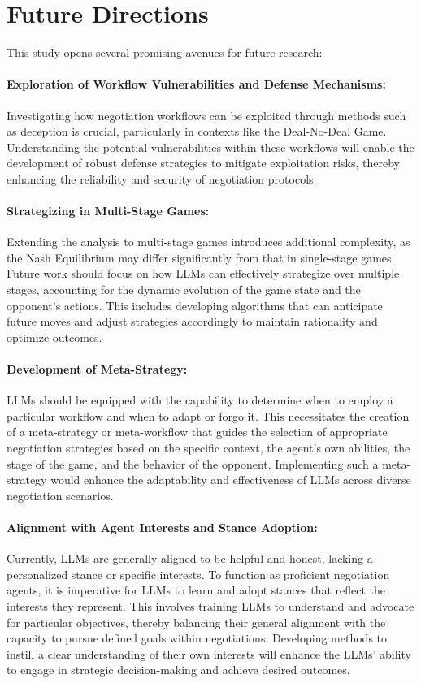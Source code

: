 \section{Future Directions}

This study opens several promising avenues for future research:

\paragraph{Exploration of Workflow Vulnerabilities and Defense Mechanisms: }Investigating how negotiation workflows can be exploited through methods such as deception is crucial, particularly in contexts like the Deal-No-Deal Game. Understanding the potential vulnerabilities within these workflows will enable the development of robust defense strategies to mitigate exploitation risks, thereby enhancing the reliability and security of negotiation protocols.

\paragraph{Strategizing in Multi-Stage Games:} Extending the analysis to multi-stage games introduces additional complexity, as the Nash Equilibrium may differ significantly from that in single-stage games. Future work should focus on how LLMs can effectively strategize over multiple stages, accounting for the dynamic evolution of the game state and the opponent's actions. This includes developing algorithms that can anticipate future moves and adjust strategies accordingly to maintain rationality and optimize outcomes.

\paragraph{Development of Meta-Strategy:} LLMs should be equipped with the capability to determine when to employ a particular workflow and when to adapt or forgo it. This necessitates the creation of a meta-strategy or meta-workflow that guides the selection of appropriate negotiation strategies based on the specific context, the agent's own abilities, the stage of the game, and the behavior of the opponent. Implementing such a meta-strategy would enhance the adaptability and effectiveness of LLMs across diverse negotiation scenarios.

\paragraph{Alignment with Agent Interests and Stance Adoption:} Currently, LLMs are generally aligned to be helpful and honest, lacking a personalized stance or specific interests. To function as proficient negotiation agents, it is imperative for LLMs to learn and adopt stances that reflect the interests they represent. This involves training LLMs to understand and advocate for particular objectives, thereby balancing their general alignment with the capacity to pursue defined goals within negotiations. Developing methods to instill a clear understanding of their own interests will enhance the LLMs' ability to engage in strategic decision-making and achieve desired outcomes.

